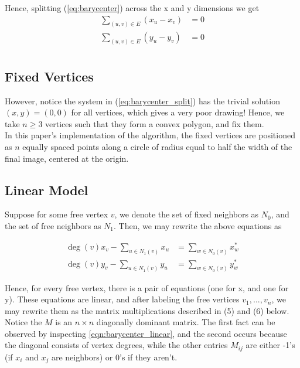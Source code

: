 \documentclass[11pt]{report}
\begin{document}
Hence, splitting (\ref{eq:barycenter}) across the x and y dimensions we get
\begin{equation}\label{eq:barycenter_split}
    \begin{aligned}
    \sum_{(u, v) \in E} (x_u - x_v) &= 0 \\
    \sum_{(u, v) \in E} (y_u - y_v) &= 0 \\
    \end{aligned}
\end{equation}

\subsection{Fixed Vertices}
However, notice the system in (\ref{eq:barycenter_split}) has the trivial solution $(x, y) = (0, 0)$ for all vertices, which gives a very poor drawing! Hence, we take $n \geq 3$ vertices such that they form a convex polygon, and fix them. \\

In this paper's implementation of the algorithm, the fixed vertices are positioned as $n$ equally spaced points along a circle of radius equal to half the width of the final image, centered at the origin.

\subsection{Linear Model}
Suppose for some free vertex $v$, we denote the set of fixed neighbors as $N_0$, and the set of free neighbors as $N_1$. Then, we may rewrite the above equations as

\begin{equation}\label{eqn:barycenter_linear}
    \begin{aligned}
        \deg{(v)}x_v - \sum_{u \in N_1(v)} x_u &= \sum_{w \in N_0(v)} x^*_w \\
        \deg{(v)}y_v - \sum_{u \in N_1(v)} y_u &= \sum_{w \in N_0(v)} y^*_w
    \end{aligned}
\end{equation}

Hence, for every free vertex, there is a pair of equations (one for x, and one for y). These equations are linear, and after labeling the free vertices $v_1, ..., v_n$, we may rewrite them as the matrix multiplications described in (5) and (6) below. Notice the $M$ is an $n \times n$ diagonally dominant matrix. The first fact can be observed by inspecting \ref{eqn:barycenter_linear}, and the second occurs because the diagonal consists of vertex degrees, while the other entries $M_{ij}$ are either -1's (if $x_i$ and $x_j$ are neighbors) or 0's if they aren't.
\end{document}
